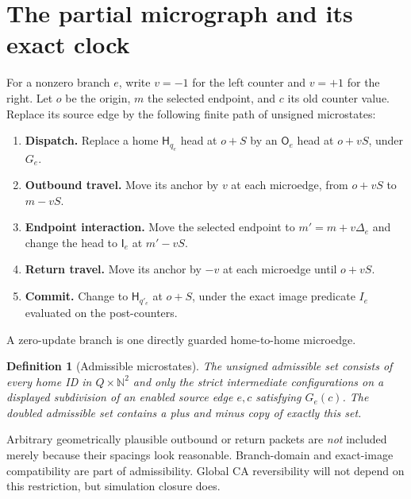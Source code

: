 \documentclass[11pt,a4paper]{article}
\numberwithin{equation}{section}
\newtheorem{definition}[theorem]{Definition}
\newcommand{\N}{\mathbb N}\newcommand{\Z}{\mathbb Z}\newcommand{\R}{\mathbb R}
\newcommand{\Hh}{\mathsf H}\newcommand{\Oo}{\mathsf O}\newcommand{\Ii}{\mathsf I}\newcommand{\HH}{\mathsf H}
\begin{document}
\section{The partial micrograph and its exact clock}\label{fpa:sec:micrograph}
For a nonzero branch $e$, write $v=-1$ for the left counter and $v=+1$ for the
right. Let $o$ be the origin, $m$ the selected endpoint, and $c$ its old counter
value. Replace its source edge by the following finite path of unsigned
microstates:
\begin{enumerate}
\item \textbf{Dispatch.} Replace a home $\Hh_{q_e}$ head at $o+S$ by an
$\Oo_e$ head at $o+vS$, under $G_e$.
\item \textbf{Outbound travel.} Move its anchor by $v$ at each microedge,
from $o+vS$ to $m-vS$.
\item \textbf{Endpoint interaction.} Move the selected endpoint to
$m'=m+v\Delta_e$ and change the head to $\Ii_e$ at $m'-vS$.
\item \textbf{Return travel.} Move its anchor by $-v$ at each microedge until
$o+vS$.
\item \textbf{Commit.} Change to $\Hh_{q'_e}$ at $o+S$, under the exact
image predicate $I_e$ evaluated on the post-counters.
\end{enumerate}
A zero-update branch is one directly guarded home-to-home microedge.

\begin{definition}[Admissible microstates]\label{fpa:def:admissible}
The unsigned admissible set consists of every home ID in $Q\times\N^2$ and
only the strict intermediate configurations on a displayed subdivision of an
\emph{enabled} source edge $e,c$ satisfying $G_e(c)$. The doubled admissible
set contains a plus and minus copy of exactly this set.
\end{definition}

Arbitrary geometrically plausible outbound or return packets are \emph{not}
included merely because their spacings look reasonable. Branch-domain and
exact-image compatibility are part of admissibility. Global CA reversibility
will not depend on this restriction, but simulation closure does.
\end{document}
